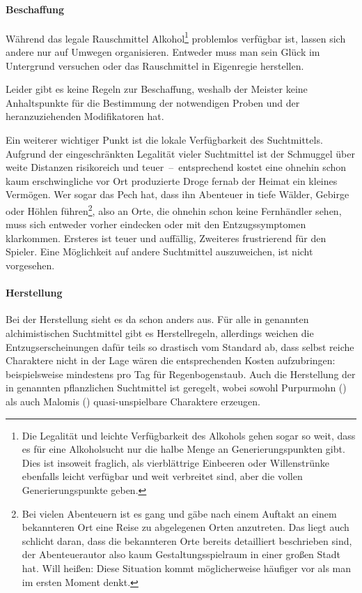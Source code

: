 \paragraph{Beschaffung}
Während das legale Rauschmittel Alkohol\footnote{Die Legalität und leichte Verfügbarkeit des Alkohols gehen sogar so weit, dass es für eine Alkoholsucht nur die halbe Menge an Generierungspunkten gibt. Dies ist insoweit fraglich, als vierblättrige Einbeeren oder Willenstrünke ebenfalls leicht verfügbar und weit verbreitet sind, aber die vollen Generierungspunkte geben.} problemlos verfügbar ist, lassen sich andere nur auf Umwegen organisieren. Entweder muss man sein Glück im Untergrund versuchen oder das Rauschmittel in Eigenregie herstellen.

Leider gibt es keine Regeln zur Beschaffung, weshalb der Meister keine Anhaltspunkte für die Bestimmung der notwendigen Proben und der heranzuziehenden Modifikatoren hat.

Ein weiterer wichtiger Punkt ist die lokale Verfügbarkeit des Suchtmittels. Aufgrund der eingeschränkten Legalität vieler Suchtmittel ist der Schmuggel über weite Distanzen risikoreich und teuer~--~entsprechend kostet eine ohnehin schon kaum erschwingliche vor Ort produzierte Droge fernab der Heimat ein kleines Vermögen. Wer sogar das Pech hat, dass ihn Abenteuer in tiefe Wälder, Gebirge oder Höhlen führen\footnote{Bei vielen Abenteuern ist es gang und gäbe nach einem Auftakt an einem bekannteren Ort eine Reise zu abgelegenen Orten anzutreten. Das liegt auch schlicht daran, dass die bekannteren Orte bereits detailliert beschrieben sind, der Abenteuerautor also kaum Gestaltungsspielraum in einer großen Stadt hat. Will heißen: Diese Situation kommt möglicherweise häufiger vor als man im ersten Moment denkt.}, also an Orte, die ohnehin schon keine Fernhändler sehen, muss sich entweder vorher eindecken oder mit den Entzugssymptomen klarkommen. Ersteres ist teuer und auffällig, Zweiteres frustrierend für den Spieler. Eine Möglichkeit auf andere Suchtmittel auszuweichen, ist nicht vorgesehen.

\paragraph{Herstellung}
Bei der Herstellung sieht es da schon anders aus. Für alle in  genannten alchimistischen Suchtmittel gibt es Herstellregeln, allerdings weichen die Entzugserscheinungen dafür teils so drastisch vom Standard ab, dass selbst reiche Charaktere nicht in der Lage wären die entsprechenden Kosten aufzubringen: beispielsweise mindestens  pro Tag für Regenbogenstaub. Auch die Herstellung der in  genannten pflanzlichen Suchtmittel ist geregelt, wobei sowohl Purpurmohn () als auch Malomis () quasi-unspielbare Charaktere erzeugen.

